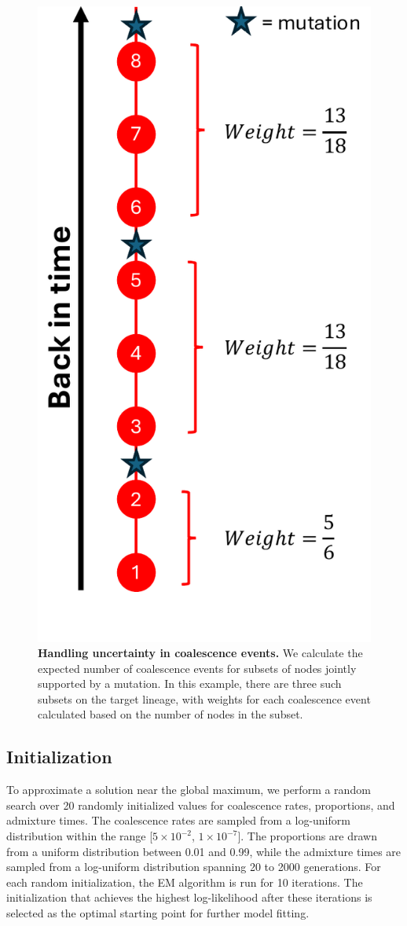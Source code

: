 \begin{figure}
    \centering
    \includegraphics[width=0.5\linewidth]{figures/thesis_gb_uncertainty_nodes.pdf}
    \caption{\textbf{Handling uncertainty in coalescence events.} We calculate the expected number of coalescence events for subsets of nodes jointly supported by a mutation. In this example, there are three such subsets on the target lineage, with weights for each coalescence event calculated based on the number of nodes in the subset.}
    \label{fig:gb_uncertainty_nodes}
\end{figure}


\subsection{Initialization}
To approximate a solution near the global maximum, we perform a random search over 20 randomly initialized values for coalescence rates, proportions, and admixture times. The coalescence rates are sampled from a log-uniform distribution within the range [$5 \times 10^{-2}$, $1 \times 10^{-7}$]. The proportions are drawn from a uniform distribution between 0.01 and 0.99, while the admixture times are sampled from a log-uniform distribution spanning 20 to 2000 generations. For each random initialization, the EM algorithm is run for 10 iterations. The initialization that achieves the highest log-likelihood after these iterations is selected as the optimal starting point for further model fitting.

